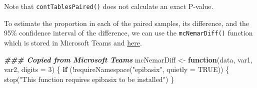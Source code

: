 \documentclass[
]{memoir}
\newenvironment{Shaded}{\begin{snugshade}}{\end{snugshade}}
\newcommand{\AttributeTok}[1]{\textcolor[rgb]{0.77,0.63,0.00}{#1}}
\newcommand{\ConstantTok}[1]{\textcolor[rgb]{0.00,0.00,0.00}{#1}}
\newcommand{\ControlFlowTok}[1]{\textcolor[rgb]{0.13,0.29,0.53}{\textbf{#1}}}
\newcommand{\DecValTok}[1]{\textcolor[rgb]{0.00,0.00,0.81}{#1}}
\newcommand{\DocumentationTok}[1]{\textcolor[rgb]{0.56,0.35,0.01}{\textbf{\textit{#1}}}}
\newcommand{\FunctionTok}[1]{\textcolor[rgb]{0.00,0.00,0.00}{#1}}
\newcommand{\NormalTok}[1]{#1}
\newcommand{\OtherTok}[1]{\textcolor[rgb]{0.56,0.35,0.01}{#1}}
\newcommand{\SpecialCharTok}[1]{\textcolor[rgb]{0.00,0.00,0.00}{#1}}
\newcommand{\StringTok}[1]{\textcolor[rgb]{0.31,0.60,0.02}{#1}}
\begin{document}
Note that \texttt{contTablesPaired()} does not calculate an exact P-value.

To estimate the proportion in each of the paired samples, its difference, and the 95\% confidence interval of the difference, we can use the \texttt{mcNemarDiff()} function which is stored in Microsoft Teams and \href{https://gist.githubusercontent.com/timothydobbins/525d25271b04b2ea72aae70c4aac8b01/raw/6b69f5b229d50daeac4c2f4cf4331e88b0c65717/mcNemarDiff.R}{here}.

\begin{Shaded}
\begin{Highlighting}[]
\DocumentationTok{\#\#\# Copied from Microsoft Teams}
\NormalTok{mcNemarDiff }\OtherTok{\textless{}{-}} \ControlFlowTok{function}\NormalTok{(data, var1, var2, }\AttributeTok{digits =} \DecValTok{3}\NormalTok{) \{}
  \ControlFlowTok{if}\NormalTok{ (}\SpecialCharTok{!}\FunctionTok{requireNamespace}\NormalTok{(}\StringTok{"epibasix"}\NormalTok{, }\AttributeTok{quietly =} \ConstantTok{TRUE}\NormalTok{)) \{}
    \FunctionTok{stop}\NormalTok{(}\StringTok{"This function requires epibasix to be installed"}\NormalTok{)}
\NormalTok{  \}}
  

\end{Highlighting}
\end{Shaded}
\end{document}
